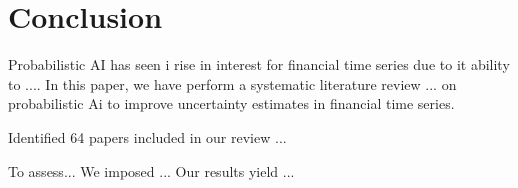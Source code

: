 \section{Conclusion}
\label{sec:conclusion}
Probabilistic AI  has seen i rise in interest for financial time series due to it ability to .... In this paper, we have perform a systematic literature review ... on probabilistic Ai to improve uncertainty estimates in financial time series.

Identified 64 papers included in our review ... 

To assess... We imposed ... Our results yield ... 

